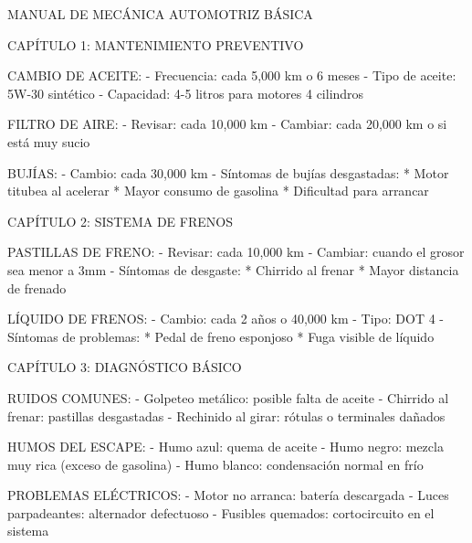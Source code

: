 \documentclass{article}
\begin{document}
MANUAL DE MECÁNICA AUTOMOTRIZ BÁSICA

CAPÍTULO 1: MANTENIMIENTO PREVENTIVO

CAMBIO DE ACEITE:
- Frecuencia: cada 5,000 km o 6 meses
- Tipo de aceite: 5W-30 sintético
- Capacidad: 4-5 litros para motores 4 cilindros

FILTRO DE AIRE:
- Revisar: cada 10,000 km
- Cambiar: cada 20,000 km o si está muy sucio

BUJÍAS:
- Cambio: cada 30,000 km
- Síntomas de bujías desgastadas: 
  * Motor titubea al acelerar
  * Mayor consumo de gasolina
  * Dificultad para arrancar

CAPÍTULO 2: SISTEMA DE FRENOS

PASTILLAS DE FRENO:
- Revisar: cada 10,000 km
- Cambiar: cuando el grosor sea menor a 3mm
- Síntomas de desgaste: 
  * Chirrido al frenar
  * Mayor distancia de frenado

LÍQUIDO DE FRENOS:
- Cambio: cada 2 años o 40,000 km
- Tipo: DOT 4
- Síntomas de problemas: 
  * Pedal de freno esponjoso
  * Fuga visible de líquido

CAPÍTULO 3: DIAGNÓSTICO BÁSICO

RUIDOS COMUNES:
- Golpeteo metálico: posible falta de aceite
- Chirrido al frenar: pastillas desgastadas
- Rechinido al girar: rótulas o terminales dañados

HUMOS DEL ESCAPE:
- Humo azul: quema de aceite
- Humo negro: mezcla muy rica (exceso de gasolina)
- Humo blanco: condensación normal en frío

PROBLEMAS ELÉCTRICOS:
- Motor no arranca: batería descargada
- Luces parpadeantes: alternador defectuoso
- Fusibles quemados: cortocircuito en el sistema
\end{document}
